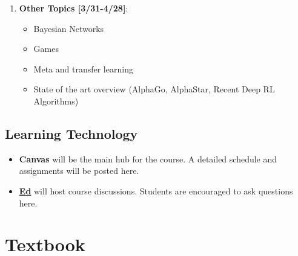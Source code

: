 \documentclass[9pt]{article}
\begin{document}
\begin{enumerate}[noitemsep]
\begin{multicols}{2}
        \begin{itemize}[noitemsep]
            \item Hidden Markov models
            \item Bayesian filters
            \item Particle filters
            \item Partially observable Markov decision processes (POMDPs)
            \item Exact POMDP methods
            \item Offline POMDP methods
            \item Online POMDP methods
            \item QMDP
        \end{itemize}
        \end{multicols}
    \item \textbf{Other Topics [3/31-4/28]}:
        \begin{multicols}{2}
        \begin{itemize}[noitemsep]
            \item Bayesian Networks
            \item Games
            \item Meta and transfer learning
            \item State of the art overview (AlphaGo, AlphaStar, Recent Deep RL Algorithms)
        \end{itemize}
        \end{multicols}
\end{enumerate}

\begin{samepage}
\section*{Learning Technology}

\begin{itemize}[nosep]
    \item \textbf{Canvas} will be the main hub for the course. A detailed schedule and assignments will be posted here.
    \item \href{https://edstem.org/}{\textbf{Ed}} will host course discussions. Students are encouraged to ask questions here.
\end{itemize}

\end{samepage}

\section*{Textbook}
\end{document}
